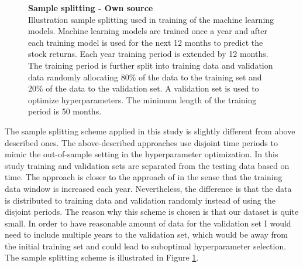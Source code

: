 \documentclass[12pt]{article}
\begin{document}
\begin{figure}[ht]
\centering
\caption[Sample splitting scheme]{\textbf{Sample splitting \textnormal{- Own source}}\\ Illustration sample splitting used in training of the machine learning models. Machine learning models are trained once a year and after each training model is used for the next 12 months to predict the stock returns. Each year training period is extended by 12 months. The training period is further split into training data and validation data randomly allocating 80\% of the data to the training set and 20\% of the data to the validation set. A validation set is used to optimize hyperparameters. The minimum length of the training period is 50 months.}
\label{plot:SampleSplitting}
\end{figure}

The sample splitting scheme applied in this study is slightly different from above described ones. The above-described approaches use disjoint time periods to mimic the out-of-sample setting in the hyperparameter optimization. In this study training and validation sets are separated from the testing data based on time. The approach is closer to the approach of \citet{guetal} in the sense that the training data window is increased each year.\footnotemark {} Nevertheless, the difference is that the data is distributed to training data and validation randomly instead of using the disjoint periods. The reason why this scheme is chosen is that our dataset is quite small. In order to have reasonable amount of data for the validation set I would need to include multiple years to the validation set, which would be away from the initial training set and could lead to suboptimal hyperparameter selection. The sample splitting scheme is illustrated in Figure \ref{plot:SampleSplitting}. \par
\end{document}
